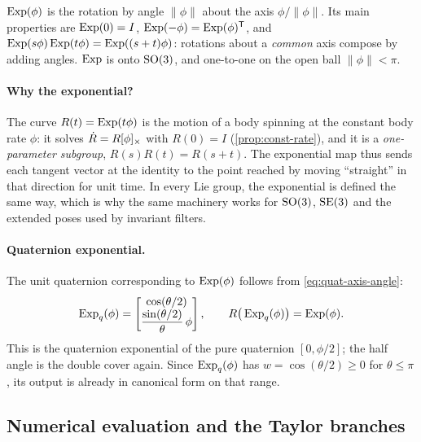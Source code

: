 $\operatorname{Exp}(\phi)$ is the rotation by angle $\|\phi\|$ about the axis $\phi/\|\phi\|$. Its main properties are
$\operatorname{Exp}(0) = I$, $\operatorname{Exp}(-\phi) = \operatorname{Exp}(\phi)^{\mathsf{T}}$, and $\operatorname{Exp}(s\phi)\operatorname{Exp}(t\phi) = \operatorname{Exp}((s+t)\phi)$: rotations about a
\emph{common} axis compose by adding angles. $\operatorname{Exp}$ is onto $\mathrm{SO}(3)$, and one-to-one on the open ball
$\|\phi\| < \pi$.

\paragraph{Why the exponential?} The curve $R(t) = \operatorname{Exp}(t\phi)$ is the motion of a body spinning at the constant body rate $\phi$: it solves
$\dot R = R[\phi]_{\times}$ with $R(0) = I$ (\cref{prop:const-rate}), and it is a \emph{one-parameter subgroup}, $R(s)R(t) = R(s + t)$. The exponential
map thus sends each tangent vector at the identity to the point reached by moving ``straight'' in that direction for unit time. In every Lie
group, the exponential is defined the same way, which is why the same machinery works for $\mathrm{SO}(3)$, $\mathrm{SE}(3)$ and the extended poses used by
invariant filters.

\paragraph{Quaternion exponential.} The unit quaternion corresponding to $\operatorname{Exp}(\phi)$ follows from
\eqref{eq:quat-axis-angle}:
\begin{equation}
  \operatorname{Exp}_q(\phi) = \begin{bmatrix} \cos(\theta/2) \\ \dfrac{\sin(\theta/2)}{\theta}\,\phi \end{bmatrix},
  \qquad R\big(\operatorname{Exp}_q(\phi)\big) = \operatorname{Exp}(\phi).
  \label{eq:Expq}
\end{equation}
This is the quaternion exponential of the pure quaternion $[0, \phi/2]$; the half angle is the double
cover again. Since $\operatorname{Exp}_q(\phi)$ has $w = \cos(\theta/2) \ge 0$ for $\theta \le \pi$, its output is
already in canonical form on that range.

\subsection{Numerical evaluation and the Taylor branches}
\label{sec:taylor}

